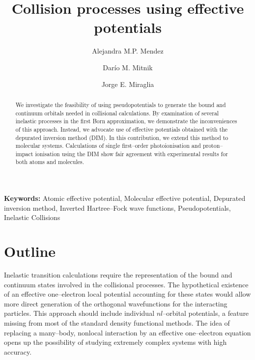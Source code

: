 \documentclass[10pt]{article}
\providecommand{\keywords}[1]{\textbf{Keywords:} #1}
\begin{document}
\title{Collision processes using effective potentials}
\author[ ]{Alejandra M.P. Mendez}
\author[ ]{Dar\'io M. Mitnik}
\author[ ]{Jorge E. Miraglia}

\maketitle

\tableofcontents

\begin{abstract}
We investigate the feasibility of using pseudopotentials to generate
the bound and continuum orbitals needed in collisional calculations. 
By examination of several inelastic processes in the first Born 
approximation, we demonstrate the inconveniences of this approach. 
Instead, we advocate use of effective potentials obtained with 
the depurated inversion method (DIM). In this contribution, we 
extend this method to molecular systems. Calculations of 
single first--order photoionisation and proton--impact ionisation 
using the DIM show fair agreement with experimental results for both 
atoms and molecules.
\end{abstract}

\keywords{Atomic effective potential, Molecular effective potential,
Depurated inversion method, Inverted Hartree--Fock wave functions, 
Pseudopotentials, Inelastic Collisions}

\section{Outline}

Inelastic transition calculations require the representation of 
the bound and continuum states involved in the collisional processes. 
The hypothetical existence of an effective one--electron local 
potential accounting for these states would allow more direct
generation of the orthogonal wavefunctions for the interacting 
particles. This approach should include individual $nl$--orbital 
potentials, a feature missing from most of the standard density 
functional methods. The idea of replacing a many--body, nonlocal 
interaction by an effective one--electron equation opens up the 
possibility of studying extremely complex systems with high accuracy. 
\end{document}
